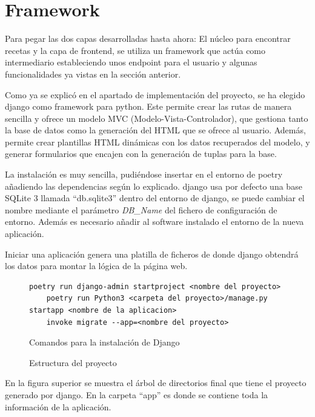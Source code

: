 \newpage
\section{Framework}
Para pegar las dos capas desarrolladas hasta ahora: El núcleo para encontrar recetas y la capa de \gls{frontend}, se utiliza un \gls{framework} que actúa como intermediario estableciendo unos \gls{endpoint} para el usuario y algunas funcionalidades ya vistas en la sección anterior. 

Como ya se explicó en el apartado de implementación del proyecto, se ha elegido \Gls{django} como \gls{framework} para \Gls{python}. Este permite crear las rutas de manera sencilla y ofrece un modelo \gls{MVC} (Modelo-Vista-Controlador), que gestiona tanto la base de datos como la generación del \gls{HTML} que se ofrece al usuario. Además, permite crear plantillas \gls{HTML} dinámicas con los datos recuperados del modelo, y generar formularios que encajen con la generación de \glspl{tupla} para la \gls{base}. 

La instalación es muy sencilla, pudiéndose insertar en el entorno de \Gls{poetry} añadiendo las dependencias según lo explicado. \Gls{django} usa por defecto una \gls{base} SQLite 3 llamada ``db.sqlite3'' dentro del entorno de \Gls{django}, se puede cambiar el nombre mediante el parámetro \emph{DB\_Name} del fichero de configuración de entorno. Además es necesario añadir al software instalado el entorno de la nueva aplicación.

Iniciar una aplicación genera una platilla de ficheros de donde \Gls{django} obtendrá los datos para montar la lógica de la página web. 
\begin{figure}[h!]
\begin{lstlisting}[style=consola]
    poetry run django-admin startproject <nombre del proyecto>
    poetry run Python3 <carpeta del proyecto>/manage.py startapp <nombre de la aplicacion>
    invoke migrate --app=<nombre del proyecto>
\end{lstlisting}
\caption{Comandos para la instalación de Django}
\end{figure}

\newpage
\begin{figure}[h!]
    \caption{Estructura del proyecto}
    \label{fig:django}
\end{figure}
En la figura superior se muestra el árbol de directorios final que tiene el proyecto generado por \Gls{django}. En la carpeta ``app'' es donde se contiene toda la información de la aplicación. 

